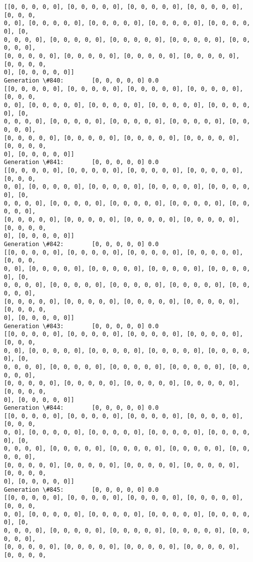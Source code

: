 \documentclass[11pt]{article}
\begin{document}
\begin{Verbatim}[commandchars=\\\{\}]
[[0, 0, 0, 0, 0], [0, 0, 0, 0, 0], [0, 0, 0, 0, 0], [0, 0, 0, 0, 0], [0, 0, 0,
0, 0], [0, 0, 0, 0, 0], [0, 0, 0, 0, 0], [0, 0, 0, 0, 0], [0, 0, 0, 0, 0], [0,
0, 0, 0, 0], [0, 0, 0, 0, 0], [0, 0, 0, 0, 0], [0, 0, 0, 0, 0], [0, 0, 0, 0, 0],
[0, 0, 0, 0, 0], [0, 0, 0, 0, 0], [0, 0, 0, 0, 0], [0, 0, 0, 0, 0], [0, 0, 0, 0,
0], [0, 0, 0, 0, 0]]
Generation \#840:        [0, 0, 0, 0, 0] 0.0
[[0, 0, 0, 0, 0], [0, 0, 0, 0, 0], [0, 0, 0, 0, 0], [0, 0, 0, 0, 0], [0, 0, 0,
0, 0], [0, 0, 0, 0, 0], [0, 0, 0, 0, 0], [0, 0, 0, 0, 0], [0, 0, 0, 0, 0], [0,
0, 0, 0, 0], [0, 0, 0, 0, 0], [0, 0, 0, 0, 0], [0, 0, 0, 0, 0], [0, 0, 0, 0, 0],
[0, 0, 0, 0, 0], [0, 0, 0, 0, 0], [0, 0, 0, 0, 0], [0, 0, 0, 0, 0], [0, 0, 0, 0,
0], [0, 0, 0, 0, 0]]
Generation \#841:        [0, 0, 0, 0, 0] 0.0
[[0, 0, 0, 0, 0], [0, 0, 0, 0, 0], [0, 0, 0, 0, 0], [0, 0, 0, 0, 0], [0, 0, 0,
0, 0], [0, 0, 0, 0, 0], [0, 0, 0, 0, 0], [0, 0, 0, 0, 0], [0, 0, 0, 0, 0], [0,
0, 0, 0, 0], [0, 0, 0, 0, 0], [0, 0, 0, 0, 0], [0, 0, 0, 0, 0], [0, 0, 0, 0, 0],
[0, 0, 0, 0, 0], [0, 0, 0, 0, 0], [0, 0, 0, 0, 0], [0, 0, 0, 0, 0], [0, 0, 0, 0,
0], [0, 0, 0, 0, 0]]
Generation \#842:        [0, 0, 0, 0, 0] 0.0
[[0, 0, 0, 0, 0], [0, 0, 0, 0, 0], [0, 0, 0, 0, 0], [0, 0, 0, 0, 0], [0, 0, 0,
0, 0], [0, 0, 0, 0, 0], [0, 0, 0, 0, 0], [0, 0, 0, 0, 0], [0, 0, 0, 0, 0], [0,
0, 0, 0, 0], [0, 0, 0, 0, 0], [0, 0, 0, 0, 0], [0, 0, 0, 0, 0], [0, 0, 0, 0, 0],
[0, 0, 0, 0, 0], [0, 0, 0, 0, 0], [0, 0, 0, 0, 0], [0, 0, 0, 0, 0], [0, 0, 0, 0,
0], [0, 0, 0, 0, 0]]
Generation \#843:        [0, 0, 0, 0, 0] 0.0
[[0, 0, 0, 0, 0], [0, 0, 0, 0, 0], [0, 0, 0, 0, 0], [0, 0, 0, 0, 0], [0, 0, 0,
0, 0], [0, 0, 0, 0, 0], [0, 0, 0, 0, 0], [0, 0, 0, 0, 0], [0, 0, 0, 0, 0], [0,
0, 0, 0, 0], [0, 0, 0, 0, 0], [0, 0, 0, 0, 0], [0, 0, 0, 0, 0], [0, 0, 0, 0, 0],
[0, 0, 0, 0, 0], [0, 0, 0, 0, 0], [0, 0, 0, 0, 0], [0, 0, 0, 0, 0], [0, 0, 0, 0,
0], [0, 0, 0, 0, 0]]
Generation \#844:        [0, 0, 0, 0, 0] 0.0
[[0, 0, 0, 0, 0], [0, 0, 0, 0, 0], [0, 0, 0, 0, 0], [0, 0, 0, 0, 0], [0, 0, 0,
0, 0], [0, 0, 0, 0, 0], [0, 0, 0, 0, 0], [0, 0, 0, 0, 0], [0, 0, 0, 0, 0], [0,
0, 0, 0, 0], [0, 0, 0, 0, 0], [0, 0, 0, 0, 0], [0, 0, 0, 0, 0], [0, 0, 0, 0, 0],
[0, 0, 0, 0, 0], [0, 0, 0, 0, 0], [0, 0, 0, 0, 0], [0, 0, 0, 0, 0], [0, 0, 0, 0,
0], [0, 0, 0, 0, 0]]
Generation \#845:        [0, 0, 0, 0, 0] 0.0
[[0, 0, 0, 0, 0], [0, 0, 0, 0, 0], [0, 0, 0, 0, 0], [0, 0, 0, 0, 0], [0, 0, 0,
0, 0], [0, 0, 0, 0, 0], [0, 0, 0, 0, 0], [0, 0, 0, 0, 0], [0, 0, 0, 0, 0], [0,
0, 0, 0, 0], [0, 0, 0, 0, 0], [0, 0, 0, 0, 0], [0, 0, 0, 0, 0], [0, 0, 0, 0, 0],
[0, 0, 0, 0, 0], [0, 0, 0, 0, 0], [0, 0, 0, 0, 0], [0, 0, 0, 0, 0], [0, 0, 0, 0,

\end{Verbatim}
\end{document}
